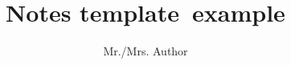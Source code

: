 \documentclass[a4paper]{article}
\def\authorsname{Mr./Mrs. Author}
\def\course{Notes template}
\def\typeoffile{example}
\begin{document}
\title{\bfseries \course \ \typeoffile}
\author{\authorsname}
\date{}

\maketitle

%






\end{document}
